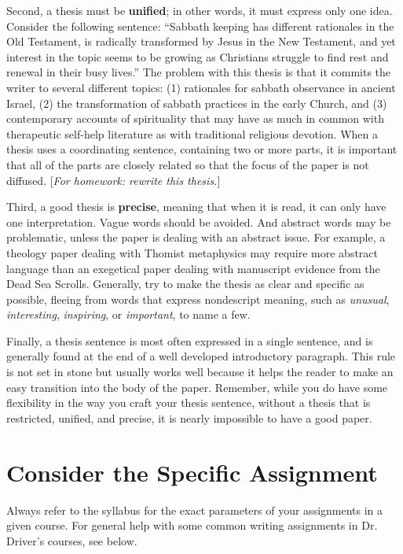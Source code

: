 \documentclass[11pt]{article}
\begin{document}
Second, a thesis must be \textbf{unified}; in other words, it must
express only one idea. Consider the following sentence: “Sabbath keeping
has different rationales in the Old Testament, is radically transformed
by Jesus in the New Testament, and yet interest in the topic seems to be
growing as Christians struggle to find rest and renewal in their busy
lives.” The problem with this thesis is that it commits the writer to
several different topics: (1) rationales for sabbath observance in
ancient Israel, (2) the transformation of sabbath practices in the early
Church, and (3) contemporary accounts of spirituality that may have as
much in common with therapeutic self-help literature as with traditional
religious devotion. When a thesis uses a coordinating sentence,
containing two or more parts, it is important that all of the parts are
closely related so that the focus of the paper is not diffused.
[\emph{For homework: rewrite this thesis.}]

Third, a good thesis is \textbf{precise}, meaning that when it is read,
it can only have one interpretation. Vague words should be avoided. And
abstract words may be problematic, unless the paper is dealing with an
abstract issue. For example, a theology paper dealing with Thomist
metaphysics may require more abstract language than an exegetical paper
dealing with manuscript evidence from the Dead Sea Scrolls. Generally,
try to make the thesis as clear and specific as possible, fleeing from
words that express nondescript meaning, such as \emph{unusual},
\emph{interesting}, \emph{inspiring}, or \emph{important}, to name a
few.

Finally, a thesis sentence is most often expressed in a single sentence,
and is generally found at the end of a well developed introductory
paragraph. This rule is not set in stone but usually works well because
it helps the reader to make an easy transition into the body of the
paper. Remember, while you do have some flexibility in the way you craft
your thesis sentence, without a thesis that is restricted, unified, and
precise, it is nearly impossible to have a good paper.

\section{Consider the Specific Assignment}

Always refer to the syllabus for the exact parameters of your
assignments in a given course. For general help with some common writing
assignments in Dr. Driver's courses, see below.
\end{document}
